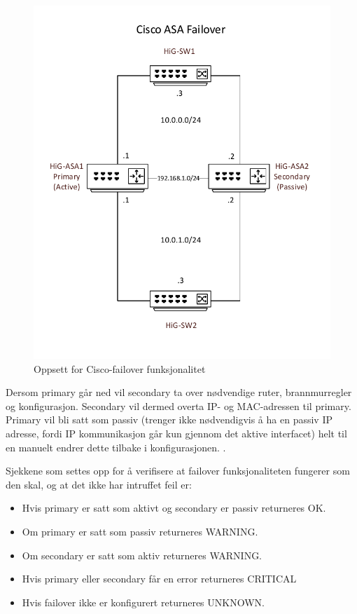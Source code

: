 \begin{figure}
    \centering
    \includegraphics[scale=0.6]{img/asafailover}
    \caption{Oppsett for Cisco-failover funksjonalitet}
    \label{ciscoasafailover}
\end{figure}


Dersom primary går ned vil secondary ta over nødvendige ruter, brannmurregler og konfigurasjon. Secondary vil dermed overta IP- og MAC-adressen til primary. Primary vil bli satt som passiv (trenger ikke nødvendigvis å ha en passiv IP adresse, fordi IP kommunikasjon går kun gjennom det aktive interfacet) helt til en manuelt endrer dette tilbake i konfigurasjonen. \cite{ciscofailover}. 

Sjekkene som settes opp for å verifisere at failover funksjonaliteten fungerer som den skal, og at det ikke har intruffet feil er:
\begin{itemize}
\item Hvis primary er satt som aktivt og secondary er passiv returneres OK.
\item Om primary er satt som passiv returneres WARNING. 
\item Om secondary er satt som aktiv returneres WARNING.
\item Hvis primary eller secondary får en error returneres CRITICAL
\item Hvis failover ikke er konfigurert returneres UNKNOWN. 
\end{itemize}

